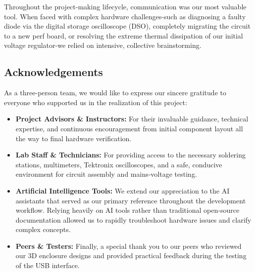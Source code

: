 \documentclass[journal,12pt,onecolumn]{IEEEtran}
\begin{document}
Throughout the project-making lifecycle, communication was our most valuable tool. When faced with complex hardware challenges-such as diagnosing a faulty diode via the digital storage oscilloscope (DSO), completely migrating the circuit to a new perf board, or resolving the extreme thermal dissipation of our initial voltage regulator-we relied on intensive, collective brainstorming.
		
\subsection*{Acknowledgements}
As a three-person team, we would like to express our sincere gratitude to everyone who supported us in the realization of this project:
		
\begin{itemize}
	\item \textbf{Project Advisors \& Instructors:} For their invaluable guidance, technical expertise, and continuous encouragement from initial component layout all the way to final hardware verification. 
	\item \textbf{Lab Staff \& Technicians:} For providing access to the necessary soldering stations, multimeters, Tektronix oscilloscopes, and a safe, conducive environment for circuit assembly and mains-voltage testing.
	\item \textbf{Artificial Intelligence Tools:} We extend our appreciation to the AI assistants that served as our primary reference throughout the development workflow. Relying heavily on AI tools rather than traditional open-source documentation allowed us to rapidly troubleshoot hardware issues and clarify complex concepts.
	\item \textbf{Peers \& Testers:} Finally, a special thank you to our peers who reviewed our 3D enclosure designs and provided practical feedback during the testing of the USB interface.
\end{itemize}
\end{document}
